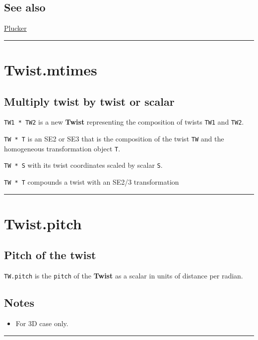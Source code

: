 \subsection*{See also}


\hyperlink{Plucker}{\color{blue} Plucker}

\vspace{1.5ex}\hrule

\hypertarget{Twist.mtimes}{\section*{Twist.mtimes}}
\subsection*{Multiply twist by twist or scalar}


\texttt{TW1 * TW2} is a new \textbf{\color{red} Twist} representing the composition of twists \texttt{TW1} and
\texttt{TW2}.



\texttt{TW * T} is an SE2 or SE3 that is the composition of the twist \texttt{TW} and the
homogeneous transformation object \texttt{T}.



\texttt{TW * S} with its twist coordinates scaled by scalar \texttt{S}.



\texttt{TW * T} compounds a twist with an SE2/3 transformation

\vspace{1.5ex}\hrule

\hypertarget{Twist.pitch}{\section*{Twist.pitch}}
\subsection*{Pitch of the twist}


\texttt{TW.pitch} is the \texttt{pitch} of the \textbf{\color{red} Twist} as a scalar in units of distance per radian.


\subsection*{Notes}
\begin{itemize}
  \item For 3D case only.
\end{itemize}
\vspace{1.5ex}\hrule

